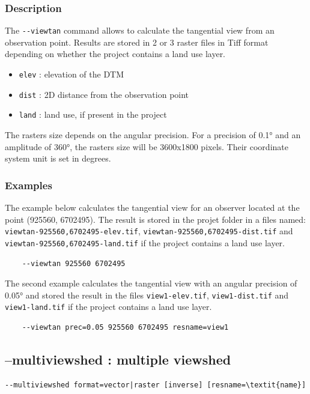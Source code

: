 \documentclass{report}
\begin{document}
\subsubsection{Description}
The \verb|--viewtan| command allows to calculate the tangential view from an observation point. Results are stored in 2 or 3 raster files in Tiff format depending on whether the project contains a land use layer.
\begin{itemize}
	\item \verb|elev| : elevation of the DTM
	\item \verb|dist| : 2D distance from the observation point
	\item \verb|land| : land use, if present in the project
\end{itemize}

The rasters size depends on the angular precision. For a precision of 0.1° and an amplitude of 360°, the rasters size will be 3600x1800 pixels. Their coordinate system unit is set in degrees.

\subsubsection{Examples}
The example below calculates the tangential view for an observer located at the point (925560, 6702495). The result is stored in the projet folder in a files named: \verb|viewtan-925560,6702495-elev.tif|, \verb|viewtan-925560,6702495-dist.tif| and \verb|viewtan-925560,6702495-land.tif| if the project contains a land use layer.
\begin{Verbatim}
	--viewtan 925560 6702495
\end{Verbatim}

The second example calculates the tangential view with an angular precision of 0.05° and stored the result in the files \verb|view1-elev.tif|, \verb|view1-dist.tif| and \verb|view1-land.tif| if the project contains a land use layer.
\begin{Verbatim}
	--viewtan prec=0.05 925560 6702495 resname=view1
\end{Verbatim}


\subsection{--multiviewshed : multiple viewshed}
\begin{Verbatim}[commandchars=\\\{\}]
--multiviewshed format=vector|raster [inverse] [resname=\textit{name}]
\end{Verbatim}
\end{document}
